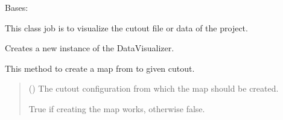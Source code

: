 \documentclass[letterpaper,10pt,english]{sphinxmanual}
\begin{document}
\begin{fulllineitems}
\label{\detokenize{apidoc/src.osm_configurator.model.project:src.osm_configurator.model.project.data_visualizer.DataVisualizer}}
\pysigstartsignatures
{}
\pysigstopsignatures
\sphinxAtStartPar
Bases: 

\sphinxAtStartPar
This class job is to visualize the cut\sphinxhyphen{}out file or data of the project.

\begin{fulllineitems}
\label{\detokenize{apidoc/src.osm_configurator.model.project:src.osm_configurator.model.project.data_visualizer.DataVisualizer.__init__}}
\pysigstartsignatures
{}
\pysigstopsignatures
\sphinxAtStartPar
Creates a new instance of the DataVisualizer.

\end{fulllineitems}


\begin{fulllineitems}
\label{\detokenize{apidoc/src.osm_configurator.model.project:src.osm_configurator.model.project.data_visualizer.DataVisualizer.create_map}}
\pysigstartsignatures
{}
\pysigstopsignatures
\sphinxAtStartPar
This method to create a map from to given cut\sphinxhyphen{}out.
\begin{quote}\begin{description}
\sphinxAtStartPar
{} ({\hyperref[\detokenize{apidoc/src.osm_configurator.model.project.configuration:src.osm_configurator.model.project.configuration.cut_out_configuration.CutOutConfiguration}]{}}) \textendash{} The cut\sphinxhyphen{}out configuration from which the map should be created.

\sphinxAtStartPar
True if creating the map works, otherwise false.


\end{description}
\end{quote}
\end{fulllineitems}
\end{fulllineitems}
\end{document}

